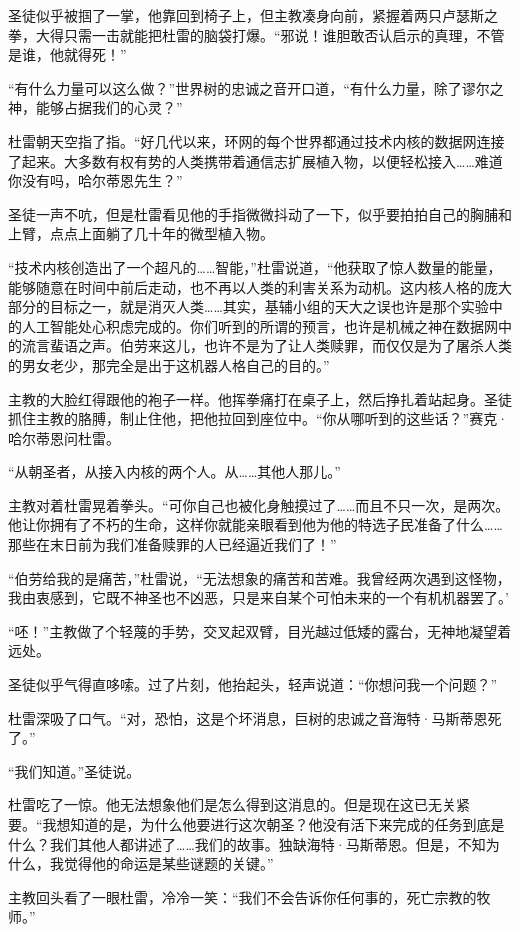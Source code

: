 \documentclass[AutoFakeBold=true]{book}
\begin{document}
圣徒似乎被掴了一掌，他靠回到椅子上，但主教凑身向前，紧握着两只卢瑟斯之拳，大得只需一击就能把杜雷的脑袋打爆。``邪说！谁胆敢否认启示的真理，不管是谁，他就得死！''

``有什么力量可以这么做？''世界树的忠诚之音开口道，``有什么力量，除了谬尔之神，能够占据我们的心灵？''

杜雷朝天空指了指。``好几代以来，环网的每个世界都通过技术内核的数据网连接了起来。大多数有权有势的人类携带着通信志扩展植入物，以便轻松接入……难道你没有吗，哈尔蒂恩先生？''

圣徒一声不吭，但是杜雷看见他的手指微微抖动了一下，似乎要拍拍自己的胸脯和上臂，点点上面躺了几十年的微型植入物。

``技术内核创造出了一个超凡的……智能，''杜雷说道，``他获取了惊人数量的能量，能够随意在时间中前后走动，也不再以人类的利害关系为动机。这内核人格的庞大部分的目标之一，就是消灭人类……其实，基辅小组的天大之误也许是那个实验中的人工智能处心积虑完成的。你们听到的所谓的预言，也许是机械之神在数据网中的流言蜚语之声。伯劳来这儿，也许不是为了让人类赎罪，而仅仅是为了屠杀人类的男女老少，那完全是出于这机器人格自己的目的。''

主教的大脸红得跟他的袍子一样。他挥拳痛打在桌子上，然后挣扎着站起身。圣徒抓住主教的胳膊，制止住他，把他拉回到座位中。``你从哪听到的这些话？''赛克·哈尔蒂恩问杜雷。

``从朝圣者，从接入内核的两个人。从……其他人那儿。''

主教对着杜雷晃着拳头。``可你自己也被化身触摸过了……而且不只一次，是两次。他让你拥有了不朽的生命，这样你就能亲眼看到他为他的特选子民准备了什么……那些在末日前为我们准备赎罪的人已经逼近我们了！''

``伯劳给我的是痛苦，''杜雷说，``无法想象的痛苦和苦难。我曾经两次遇到这怪物，我由衷感到，它既不神圣也不凶恶，只是来自某个可怕未来的一个有机机器罢了。'

``呸！''主教做了个轻蔑的手势，交叉起双臂，目光越过低矮的露台，无神地凝望着远处。

圣徒似乎气得直哆嗦。过了片刻，他抬起头，轻声说道：``你想问我一个问题？''

杜雷深吸了口气。``对，恐怕，这是个坏消息，巨树的忠诚之音海特·马斯蒂恩死了。''

``我们知道。''圣徒说。

杜雷吃了一惊。他无法想象他们是怎么得到这消息的。但是现在这已无关紧要。``我想知道的是，为什么他要进行这次朝圣？他没有活下来完成的任务到底是什么？我们其他人都讲述了……我们的故事。独缺海特·马斯蒂恩。但是，不知为什么，我觉得他的命运是某些谜题的关键。''

主教回头看了一眼杜雷，冷冷一笑：``我们不会告诉你任何事的，死亡宗教的牧师。''
\end{document}
